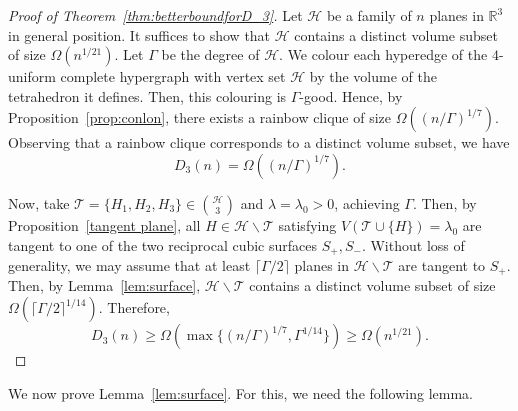 \documentclass[a4paper,oneside,10pt]{amsart}
\begin{document}
\begin{proof}[Proof of Theorem~\ref{thm:betterboundforD_3}]
Let $\mathcal{H}$ be a family of $n$ planes in $\mathbb{R}^3$ in general position.
It suffices to show that $\mathcal{H}$ contains a distinct volume subset of size $\Omega (n^{1/21})$.
Let $\Gamma$ be the degree of $\mathcal{H}$. 
We colour each hyperedge of the $4$-uniform complete hypergraph with vertex set $\mathcal{H}$ by the volume of the tetrahedron it defines. Then, this colouring is $\Gamma$-good.
 Hence, by Proposition~\ref{prop:conlon}, there exists a rainbow clique of size $\Omega ((n/\Gamma)^{1/7})$. 
 Observing that a rainbow clique corresponds to a distinct volume subset, we have
$$
D_3 (n) = \Omega ((n/\Gamma)^{1/7}).
$$

Now, take $\mathcal{T} = \{ H_1, H_2, H_3 \} \in \binom{\mathcal{H}}{3}$ and $\lambda = \lambda_0 > 0$, achieving $\Gamma$. Then, by Proposition~\ref{tangent plane}, 
all $H \in \mathcal{H} \backslash \mathcal{T}$ satisfying $V(\mathcal{T} \cup \{H \} ) = \lambda_0$ are tangent to one of the two reciprocal cubic surfaces $S_{+}, S_{-}$. Without loss of generality, we may assume that at least $\lceil \Gamma/2 \rceil$ planes in $ \mathcal{H} \backslash \mathcal{T}$ are tangent to $S_{+}$. Then, by Lemma~\ref{lem:surface}, $\mathcal{H} \backslash \mathcal{T}$ contains a distinct volume subset of size $\Omega (\lceil \Gamma/2 \rceil^{1/14})$. Therefore,
$$
D_3 (n) \geq \Omega (\max \{ (n/\Gamma)^{1/7}, \Gamma^{1/14} \}) \geq \Omega (n^{1/21}).
$$
\end{proof}



We now prove Lemma~\ref{lem:surface}. For this, we need the following lemma.
\end{document}
